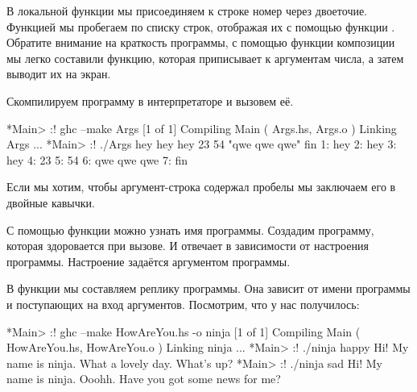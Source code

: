 В локальной функции  мы присоединяем к строке номер
через двоеточие. Функцией  мы пробегаем по списку
строк, отображая их с помощью функции . 
Обратите внимание на краткость программы, с помощью функции композиции
мы легко составили функцию, которая приписывает к аргументам
числа, а затем выводит их на экран.

Скомпилируем программу в интерпретаторе и вызовем её.

\begin{code}
*Main> :! ghc --make Args
[1 of 1] Compiling Main             ( Args.hs, Args.o )
Linking Args ...
*Main> :! ./Args hey hey hey 23 54 "qwe qwe qwe" fin
1: hey
2: hey
3: hey
4: 23
5: 54
6: qwe qwe qwe
7: fin
\end{code}

Если мы хотим, чтобы аргумент-строка содержал пробелы мы 
заключаем его в двойные кавычки. 


С помощью функции  можно узнать имя программы.
Создадим программу, которая здоровается при вызове. И отвечает
в зависимости от настроения программы. Настроение
задаётся аргументом программы. 


В функции  мы составляем реплику программы.
Она зависит от имени программы и поступающих на
вход аргументов. Посмотрим, что у нас получилось:

\begin{code}
*Main> :! ghc --make HowAreYou.hs -o ninja 
[1 of 1] Compiling Main             ( HowAreYou.hs, HowAreYou.o )
Linking ninja ...
*Main> :! ./ninja happy
Hi! My name is ninja.
What a lovely day. What's up?
*Main> :! ./ninja sad
Hi! My name is ninja.
Ooohh. Have you got some news for me?
\end{code}

